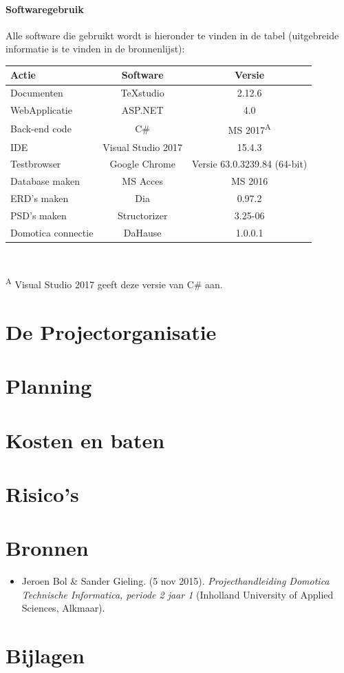 \documentclass[11pt]{article}
\begin{document}
\paragraph{Softwaregebruik}
\begin{flushleft}
Alle software die gebruikt wordt is hieronder te vinden in de tabel (uitgebreide informatie is te vinden in de bronnenlijst):\\
\begin{tabular}[h]{l c c}
	Actie & Software & Versie\\ \hline
	Documenten & TeXstudio & 2.12.6\\ \hline 
	WebApplicatie & ASP.NET & 4.0\\ \hline
	Back-end code & C\# &  MS 2017\textsuperscript{A} \\ \hline
	IDE & Visual Studio 2017 & 15.4.3\\ \hline
	Testbrowser & Google Chrome & Versie 63.0.3239.84 (64-bit)\\ \hline
	Database maken & MS Acces & MS 2016\\ \hline
	ERD's maken & Dia & 0.97.2\\ \hline
	PSD's maken & Structorizer & 3.25-06\\ \hline
	Domotica connectie & DaHause & 1.0.0.1 \\ \hline
	
	\end{tabular}\\ 
\vspace{4mm}

\textsuperscript{A} Visual Studio 2017 geeft deze versie van C\# aan.
\end{flushleft}
\newpage
\section{De Projectorganisatie}
\newpage
\section{Planning}
\newpage
\section{Kosten en baten}
\newpage
\section{Risico's}
\newpage
\section{Bronnen}
\begin{itemize}
	\item Jeroen Bol \& Sander Gieling. (5 nov 2015). \textit{Projecthandleiding Domotica Technische Informatica, periode 2 jaar 1} (Inholland University of Applied Sciences, Alkmaar).  
\end{itemize}




\section{Bijlagen}
\end{document}
